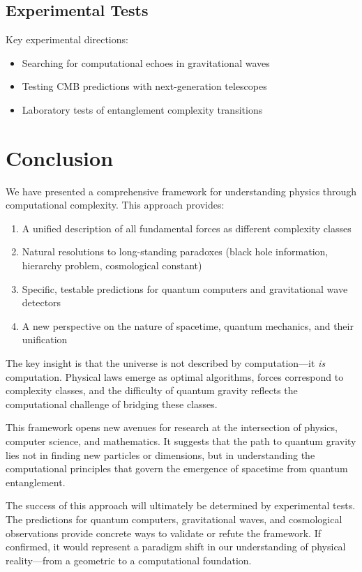 \documentclass[12pt,a4paper]{article}
\begin{document}
\subsection{Experimental Tests}

Key experimental directions:
\begin{itemize}
\item Searching for computational echoes in gravitational waves
\item Testing CMB predictions with next-generation telescopes
\item Laboratory tests of entanglement complexity transitions
\end{itemize}

\section{Conclusion}

We have presented a comprehensive framework for understanding physics through computational complexity. This approach provides:

\begin{enumerate}
\item A unified description of all fundamental forces as different complexity classes
\item Natural resolutions to long-standing paradoxes (black hole information, hierarchy problem, cosmological constant)
\item Specific, testable predictions for quantum computers and gravitational wave detectors
\item A new perspective on the nature of spacetime, quantum mechanics, and their unification
\end{enumerate}

The key insight is that the universe is not described by computation—it \textit{is} computation. Physical laws emerge as optimal algorithms, forces correspond to complexity classes, and the difficulty of quantum gravity reflects the computational challenge of bridging these classes.

This framework opens new avenues for research at the intersection of physics, computer science, and mathematics. It suggests that the path to quantum gravity lies not in finding new particles or dimensions, but in understanding the computational principles that govern the emergence of spacetime from quantum entanglement.

The success of this approach will ultimately be determined by experimental tests. The predictions for quantum computers, gravitational waves, and cosmological observations provide concrete ways to validate or refute the framework. If confirmed, it would represent a paradigm shift in our understanding of physical reality—from a geometric to a computational foundation.
\end{document}
